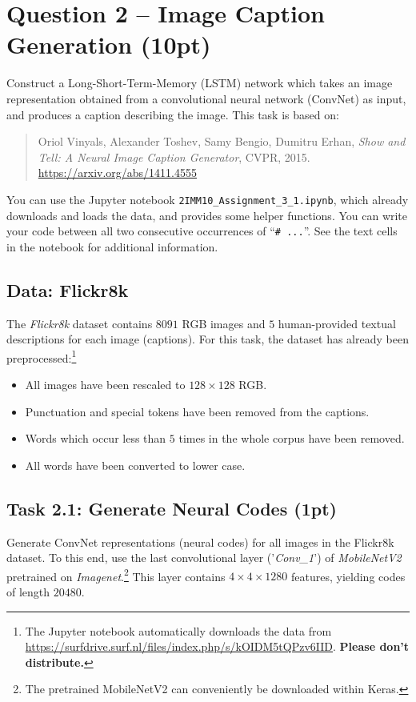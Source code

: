 \documentclass[a4paper,twoside,10pt]{article}
\begin{document}
\section*{Question 2 -- Image Caption Generation (10pt)}

Construct a Long-Short-Term-Memory (LSTM) network which takes an image representation obtained from a convolutional neural network (ConvNet) as input, and produces a caption describing the image.
This task is based on: 
%
\begin{quote}
Oriol Vinyals, Alexander Toshev, Samy Bengio, Dumitru Erhan, 
\textit{Show and Tell: A Neural Image Caption Generator}, 
CVPR, 2015.
\url{https://arxiv.org/abs/1411.4555}
\end{quote}
%
You can use the Jupyter notebook \verb!2IMM10_Assignment_3_1.ipynb!, which already downloads and loads the data, and provides some helper functions.
You can write your code between all two consecutive occurrences of ``\verb!# ...!''.
See the text cells in the notebook for additional information.
	
	
\subsection*{Data: Flickr8k}

The \emph{Flickr8k} dataset contains $8091$ RGB images and $5$ human-provided textual descriptions for each image (captions).
For this task, the dataset has already been preprocessed:\footnote{The Jupyter notebook automatically downloads the data from \url{https://surfdrive.surf.nl/files/index.php/s/kOIDM5tQPzv6IID}. \textbf{Please don't distribute.}}
\begin{itemize}
\item All images have been rescaled to $128 \times 128$ RGB.
\item Punctuation and special tokens have been removed from the captions.
\item Words which occur less than $5$ times in the whole corpus have been removed.
\item All words have been converted to lower case.
\end{itemize}

	
	
\subsection*{Task 2.1: Generate Neural Codes (1pt)}

Generate ConvNet representations (neural codes) for all images in the Flickr8k dataset.
To this end, use the last convolutional layer ('\emph{Conv\_1}') of \emph{MobileNetV2} pretrained on \emph{Imagenet}.\footnote{The pretrained MobileNetV2 can conveniently be downloaded within Keras.}
This layer contains $4 \times 4 \times 1280$ features, yielding codes of length $20480$.
	
\end{document}
